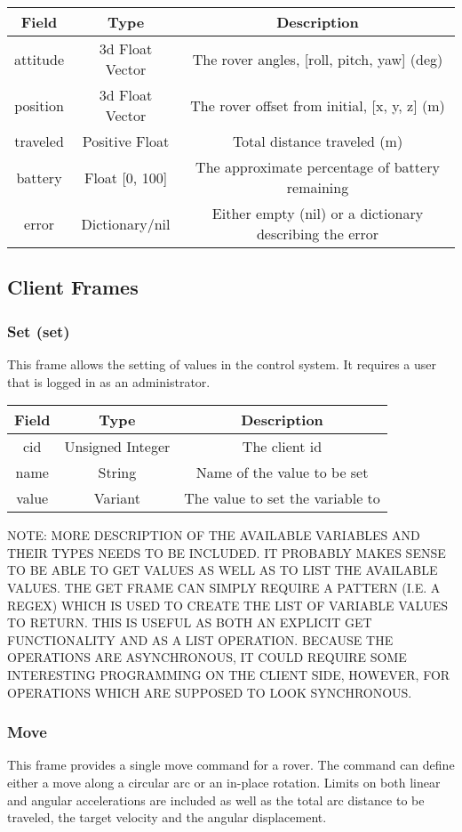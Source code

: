 \documentclass[letterpaper,10pt]{article}
\begin{document}
      \begin{tabular}{ccc}
	\textbf{Field} & \textbf{Type} & \textbf{Description}\\\hline
	attitude & 3d Float Vector & The rover angles, [roll, pitch, yaw] (deg)\\
	position & 3d Float Vector & The rover offset from initial, [x, y, z] (m)\\
	traveled & Positive Float & Total distance traveled (m)\\
	battery & Float [0, 100] & The approximate percentage of battery remaining\\
	error & Dictionary/nil & Either empty (nil) or a dictionary describing the error\\
      \end{tabular}
        
  \subsection{Client Frames}
    \subsubsection{Set (set)}
      This frame allows the setting of values in the control system.  It requires a user that is logged in as an administrator.
      
      \begin{tabular}{ccc}
	\textbf{Field} & \textbf{Type} & \textbf{Description}\\\hline
	cid & Unsigned Integer & The client id\\
	name & String & Name of the value to be set\\
	value & Variant & The value to set the variable to\\
      \end{tabular}
      
      NOTE: MORE DESCRIPTION OF THE AVAILABLE VARIABLES AND THEIR TYPES NEEDS TO BE INCLUDED.  IT PROBABLY MAKES SENSE TO BE ABLE TO GET VALUES AS WELL AS TO LIST THE AVAILABLE VALUES.  THE GET FRAME CAN SIMPLY REQUIRE A PATTERN (I.E. A REGEX) WHICH IS USED TO CREATE THE LIST OF VARIABLE VALUES TO RETURN.  THIS IS USEFUL AS BOTH AN EXPLICIT GET FUNCTIONALITY AND AS A LIST OPERATION.  BECAUSE THE OPERATIONS ARE ASYNCHRONOUS, IT COULD REQUIRE SOME INTERESTING PROGRAMMING ON THE CLIENT SIDE, HOWEVER, FOR OPERATIONS WHICH ARE SUPPOSED TO LOOK SYNCHRONOUS.
  
    \subsubsection{Move}
      This frame provides a single move command for a rover.  The command can define either a move along a circular arc or an in-place rotation.  Limits on both linear and angular accelerations are included as well as the total arc distance to be traveled, the target velocity and the angular displacement.
      
\end{document}
